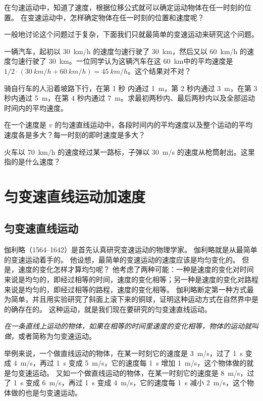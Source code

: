 在匀速运动中，知道了速度，根据位移公式就可以确定运动物体在任一时刻的位置。
在变速运动中，怎样确定物体在任一时刻的位置和速度呢？

一般地讨论这个问题过于复杂，下面我们只就最简单的变速运动来研究这个问题。

\begin{Practice}
\begin{question}
\item 一辆汽车，起初以 \qty{30}{km/h} 的速度匀速行驶了 \qty{30}{km}，然后又以 \qty{60}{km/h} 的速度匀速行驶了 \qty{30}{km}。一位同学认为这辆汽车在这 \qty{60}{km}中的平均速度是 $1/2\cdot(\qty{30}{km/h}+\qty{60}{km/h})=\qty{45}{km/h}$。这个结果对不对？
\item 骑自行车的人沿着坡路下行，在第 1 秒 内通过 \qty{1}{m}，第 2 秒内通过 \qty{3}{m}，在第 3 秒内通过 \qty{5}{m}，在第 4 秒内通过 \qty{7}{m}。求最初两秒内、最后两秒内以及全部运动时间内的平均速度。
\item 在一个速度是 $v$ 的匀速直线运动中，各段时间内的平均速度以及整个运动的平均速度各是多大？每一时刻的即时速度是多大？
\item 火车以 \qty{70}{km/h} 的速度经过某一路标，子弹以 \qty{30}{m/s} 的速度从枪筒射出。这里指的是什么速度？
\end{question}
\end{Practice}

\section{匀变速直线运动\texorpdfstring{\quad}{ }加速度}
\subsection{匀变速直线运动}
伽利略（1564--1642）是首先认真研究变速运动的物理学家。
伽利略就是从最简单的变速运动着手的。
他设想，最简单的变速运动的速度应该是均匀变化的。
但是，速度的变化怎样才算均匀呢？
他考虑了两种可能：一种是速度的变化对时间来说是均匀的，即经过相等的时间，速度的变化相等；另一种是速度的变化对路程来说是均匀的，即经过相等的路程，速度的变化相等。
伽利略断定第一种方式最为简单，并且用实验研究了斜面上滚下来的铜球，证明这种运动方式在自然界中是的确存在的。
这种运动，就是我们现在要研究的匀变速直线运动。

\emph{在一条直线上运动的物体，如果在相等的时间里速度的变化相等，物体的运动就叫做}，或者简称为匀变速运动。

举例来说，一个做直线运动的物体，在某一时刻它的速度是 \qty{3}{m/s}，过了 \qty{1}{s} 变成 \qty{4}{m/s}，再过 \qty{1}{s} 变成 \qty{5}{m/s}，它的速度每 \qty{1}{s} 增加 \qty{1}{m/s}，这个物体做的就是匀变速运动。
又如一个做直线运动的物体，在某一时刻它的速度是 \qty{8}{m/s}，过了 \qty{1}{s} 变成 \qty{6}{m/s}，再过 \qty{1}{s} 变成 \qty{4}{m/s}，它的速度每 \qty{1}{s} 减小 \qty{2}{m/s}，这个物体做的也是匀变速运动。

